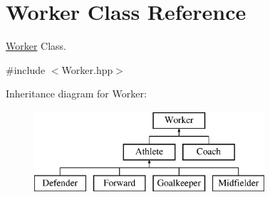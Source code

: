 \hypertarget{class_worker}{}\section{Worker Class Reference}
\label{class_worker}


\hyperlink{class_worker}{Worker} Class.  




{\ttfamily \#include $<$Worker.\+hpp$>$}

Inheritance diagram for Worker\+:\begin{figure}[H]
\begin{center}
\leavevmode
\includegraphics[height=3.000000cm]{class_worker}
\end{center}
\end{figure}
